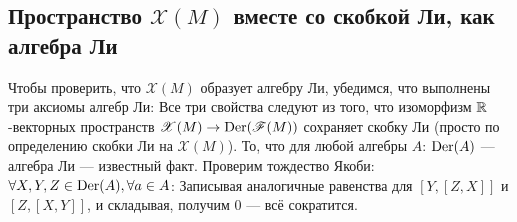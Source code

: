 \documentclass[a4paper]{report}
\begin{document}
    \subsection{Пространство $\mathscr{X}(M)$ вместе со скобкой Ли, как алгебра Ли}
    Чтобы проверить, что $\mathscr{X}(M)$ образует алгебру Ли, убедимся, что выполнены три аксиомы алгебр Ли:
    Все три свойства следуют из того, что изоморфизм $\mathbb{R}$-векторных пространств $\mathscr{X}(M) \rightarrow \operatorname{Der}(\mathscr{F}(M))$ сохраняет скобку Ли (просто по определению скобки Ли на $\mathscr{X}(M)$).
    То, что для любой алгебры $A$: $\operatorname{Der}(A)$ --- алгебра Ли --- известный факт.
    Проверим тождество Якоби: $\forall X, Y, Z \in \operatorname{Der}(A), \forall a \in A$:
    Записывая аналогичные равенства для $[Y, [Z, X]]$ и $[Z, [X, Y]]$, и складывая, получим $0$ --- всё сократится.
\end{document}
